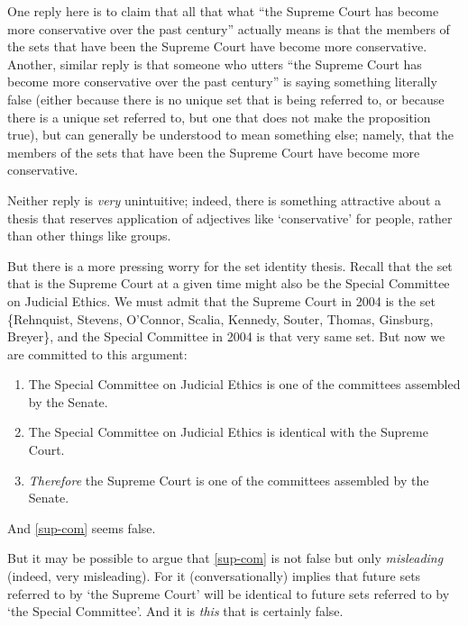 \documentclass[11pt]{article}
\begin{document}
\begin{spacing}{1.5}
One reply here is to claim that all that what ``the Supreme Court has
become more conservative over the past century'' actually means is
that the members of the sets that have been the Supreme Court have
become more conservative.  Another, similar reply is that someone who
utters ``the Supreme Court has become more conservative over the past
century'' is saying something literally false (either because there is
no unique set that is being referred to, or because there is a unique
set referred to, but one that does not make the proposition true), but
can generally be understood to mean something else; namely, that the
members of the sets that have been the Supreme Court have become more
conservative.

Neither reply is {\em very} unintuitive; indeed, there is something
attractive about a thesis that reserves application of adjectives like
`conservative' for people, rather than other things like groups.

But there is a more pressing worry for the set identity thesis.
Recall that the set that is the Supreme Court at a given time might
also be the Special Committee on Judicial Ethics.  We must admit that
the Supreme Court in 2004 is the set \{Rehnquist, Stevens, O'Connor,
Scalia, Kennedy, Souter, Thomas, Ginsburg, Breyer\}, and the Special
Committee in 2004 is that very same set.  But now we are committed to
this argument:

\begin{enumerate}[ref=(\arabic*)]
  \item The Special Committee on Judicial Ethics is one of the
    committees assembled by the Senate.

  \item The Special Committee on Judicial Ethics is identical with the
    Supreme Court.

  \item {\em Therefore} the Supreme Court is one of the committees
    assembled by the
    Senate. \citep[144]{uzquiano2004a} \label{sup-com}
\end{enumerate}

And \ref{sup-com} seems false.

But it may be possible to argue that \ref{sup-com} is not false but
only {\em misleading} (indeed, very misleading).  For it
(conversationally) implies that future sets referred to by `the
Supreme Court' will be identical to future sets referred to by `the
Special Committee'.  And it is {\em this} that is certainly false.


\end{spacing}
\end{document}
